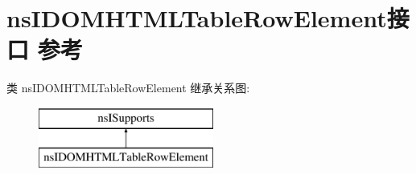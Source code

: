 \hypertarget{interfacens_i_d_o_m_h_t_m_l_table_row_element}{}\section{ns\+I\+D\+O\+M\+H\+T\+M\+L\+Table\+Row\+Element接口 参考}
\label{interfacens_i_d_o_m_h_t_m_l_table_row_element}
类 ns\+I\+D\+O\+M\+H\+T\+M\+L\+Table\+Row\+Element 继承关系图\+:\begin{figure}[H]
\begin{center}
\leavevmode
\includegraphics[height=2.000000cm]{interfacens_i_d_o_m_h_t_m_l_table_row_element}
\end{center}
\end{figure}
